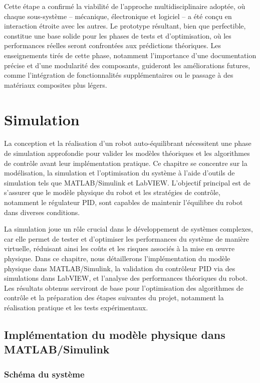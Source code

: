 \documentclass{report}
\begin{document}
Cette étape a confirmé la viabilité de l’approche multidisciplinaire adoptée, où chaque sous-système – mécanique, électronique et logiciel – a été conçu en interaction étroite avec les autres. Le prototype résultant, bien que perfectible, constitue une base solide pour les phases de tests et d’optimisation, où les performances réelles seront confrontées aux prédictions théoriques. Les enseignements tirés de cette phase, notamment l’importance d’une documentation précise et d’une modularité des composants, guideront les améliorations futures, comme l’intégration de fonctionnalités supplémentaires ou le passage à des matériaux composites plus légers.


\chapter{Simulation}

La conception et la réalisation d'un robot auto-équilibrant nécessitent une phase de simulation approfondie pour valider les modèles théoriques et les algorithmes de contrôle avant leur implémentation pratique. Ce chapitre se concentre sur la modélisation, la simulation et l'optimisation du système à l'aide d'outils de simulation tels que MATLAB/Simulink et LabVIEW. L'objectif principal est de s'assurer que le modèle physique du robot et les stratégies de contrôle, notamment le régulateur PID, sont capables de maintenir l'équilibre du robot dans diverses conditions.

La simulation joue un rôle crucial dans le développement de systèmes complexes, car elle permet de tester et d'optimiser les performances du système de manière virtuelle, réduisant ainsi les coûts et les risques associés à la mise en œuvre physique. Dans ce chapitre, nous détaillerons l'implémentation du modèle physique dans MATLAB/Simulink, la validation du contrôleur PID via des simulations dans LabVIEW, et l'analyse des performances théoriques du robot. Les résultats obtenus serviront de base pour l'optimisation des algorithmes de contrôle et la préparation des étapes suivantes du projet, notamment la réalisation pratique et les tests expérimentaux.
\section{Implémentation du modèle physique dans MATLAB/Simulink}
\label{sec:matlab}

\subsection{Schéma du système}
\label{subsec:schema_systeme}
\end{document}
